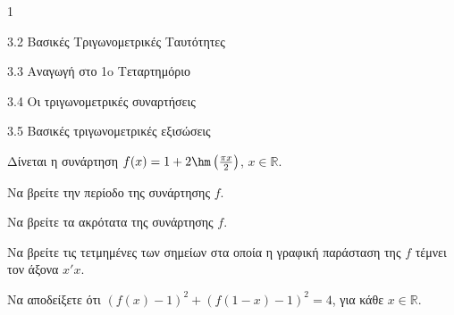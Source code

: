 \begin{ylh}{1}
\item 3.2 Βασικές Τριγωνομετρικές Ταυτότητες
\item 3.3 Αναγωγή στο 1o Τεταρτημόριο
\item 3.4 Οι τριγωνομετρικές συναρτήσεις
\item 3.5 Βασικές τριγωνομετρικές εξισώσεις
\end{ylh}
Δίνεται η συνάρτηση $f(x) = 1 + 2\hm \left(\frac{\pi x}{2}\right)$, $x \in \mathbb{R}$.
\begin{alist}
\item Να βρείτε την περίοδο της συνάρτησης $f$.
\item Να βρείτε τα ακρότατα της συνάρτησης $f$.
\item Να βρείτε τις τετμημένες των σημείων στα οποία η γραφική παράσταση της $f$ τέμνει τον άξονα $x'x$.
\item Να αποδείξετε ότι $(f(x) - 1)^2 + (f(1-x) - 1)^2 = 4$, για κάθε $x \in \mathbb{R}$.
\end{alist}

